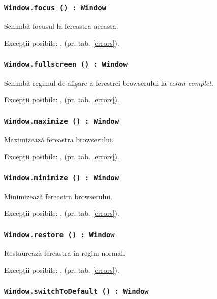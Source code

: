 \subsubsection{\texttt{Window.focus () : Window}}

Schimbă focusul la fereastra aceasta.

Excepții posibile: ,  (pr. tab. \ref{errors}).

\subsubsection{\texttt{Window.fullscreen () : Window}}

Schimbă regimul de afișare a ferestrei browserului la \textit{ecran complet}.

Excepții posibile: ,  (pr. tab. \ref{errors}).

\subsubsection{\texttt{Window.maximize () : Window}}

Maximizează fereastra browserului.

Excepții posibile: ,  (pr. tab. \ref{errors}).

\subsubsection{\texttt{Window.minimize () : Window}}

Minimizează fereastra browserului.

Excepții posibile: ,  (pr. tab. \ref{errors}).

\subsubsection{\texttt{Window.restore () : Window}}

Restaurează fereastra în regim normal.

Excepții posibile: ,  (pr. tab. \ref{errors}).

\subsubsection{\texttt{Window.switchToDefault () : Window}}

